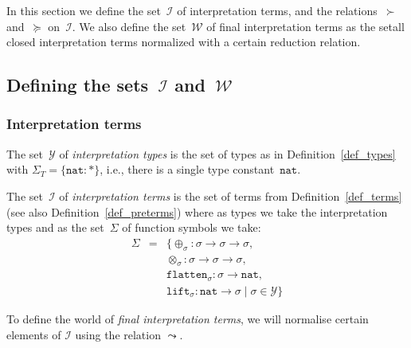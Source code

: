 \documentclass[runningheads,a4paper]{llncs}
\newcommand{\Iterms}{\mathcal{I}}
\newcommand{\World}{\mathcal{W}}
\newcommand{\ITypes}{\mathcal{Y}}
\newcommand{\arrtype}{\rightarrow}
\newcommand{\nat}{\mathtt{nat}}
\newcommand{\flatten}{\mathtt{flatten}}
\newcommand{\lift}{\mathtt{lift}}
\begin{document}
In this section we define the set~$\Iterms$ of interpretation terms,
and the relations~$\succ$ and~$\succeq$ on~$\Iterms$. We also define
the set~$\World$ of final interpretation terms as the setall closed
interpretation terms normalized with a certain reduction relation.

\subsection{Defining the sets~$\Iterms$ and~$\World$}\label{sec_world}

\subsubsection{Interpretation terms}

\begin{definition}\label{def_iterms}\normalfont
  The set~$\ITypes$ of \emph{interpretation types} is the set of types
  as in Definition~\ref{def_types} with $\Sigma_T = \{ \nat : * \}$,
  i.e., there is a single type constant~$\nat$.

  The set~$\Iterms$ of \emph{interpretation terms} is the set of terms
  from Definition~\ref{def_terms} (see also
  Definition~\ref{def_preterms}) where as types we take the
  interpretation types and as the set~$\Sigma$ of function symbols we
  take:
  \[
    \begin{array}{rcl}
      \Sigma &=& \{ \oplus_\sigma : \sigma \arrtype
                 \sigma \arrtype \sigma,\\ & & \otimes_\sigma : \sigma \arrtype \sigma
                 \arrtype \sigma,\\ & & \flatten_{\sigma} : \sigma \arrtype
                 \nat,\\ & & \lift_{\sigma} : \nat \arrtype \sigma \mid \sigma \in \ITypes
                 \}
    \end{array}
  \]
\end{definition}

To define the world of \emph{final interpretation terms}, we will
normalise certain elements of $\Iterms$ using the relation $\leadsto$.
\end{document}
